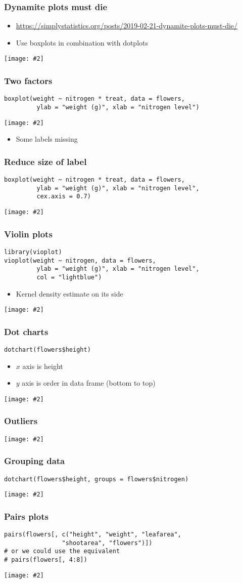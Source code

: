 \documentclass{beamer}
\newcommand{\bi}{\begin{itemize}}
\newcommand{\li}{\item}
\newcommand{\ei}{\end{itemize}}
\newcommand{\fig}[2]{\centerline{\texttt{[image: \#2]}}}
\newcommand{\bfr}[1]{\begin{frame}[fragile]\frametitle{{ #1 }}}
\begin{document}
\bfr{Dynamite plots must die}
\bi
\li\url{https://simplystatistics.org/posts/2019-02-21-dynamite-plots-must-die/}
\li Use boxplots in combination with dotplots
\ei
\fig{1}{show-data-1.png}
\end{frame}

\bfr{Two factors}
{\scriptsize
\begin{verbatim}
boxplot(weight ~ nitrogen * treat, data = flowers, 
         ylab = "weight (g)", xlab = "nitrogen level")
\end{verbatim}
}
\fig{.8}{plot14-1.png}
\bi\li Some labels missing\ei
\end{frame}

\bfr{Reduce size of label}
{\scriptsize
\begin{verbatim}
boxplot(weight ~ nitrogen * treat, data = flowers, 
         ylab = "weight (g)", xlab = "nitrogen level", 
         cex.axis = 0.7)
\end{verbatim}
}
\fig{.8}{plot15-1.png}
\end{frame}

\bfr{Violin plots}
{\scriptsize
\begin{verbatim}
library(vioplot)
vioplot(weight ~ nitrogen, data = flowers, 
         ylab = "weight (g)", xlab = "nitrogen level",
         col = "lightblue")
\end{verbatim}
}
\bi\li Kernel density estimate on its side\ei
\fig{.8}{plot16-1.png}
\end{frame}

\bfr{Dot charts}
{\scriptsize
\begin{verbatim}
dotchart(flowers$height)
\end{verbatim}
}
\bi
\li $x$ axis is height
\li $y$ axis is order in data frame (bottom to top)
\ei
\fig{.8}{plot17-1.png}
\end{frame}

\bfr{Outliers}
\fig{1}{plot18-1.png}
\end{frame}


\bfr{Grouping data}
{\scriptsize
\begin{verbatim}
dotchart(flowers$height, groups = flowers$nitrogen)
\end{verbatim}
}
\fig{1}{plot19-1.png}
\end{frame}


\bfr{Pairs plots}
{\scriptsize
\begin{verbatim}
pairs(flowers[, c("height", "weight", "leafarea", 
                "shootarea", "flowers")])
# or we could use the equivalent
# pairs(flowers[, 4:8])
\end{verbatim}
}
\fig{.8}{plot20-1.png}
\end{frame}
\end{document}

